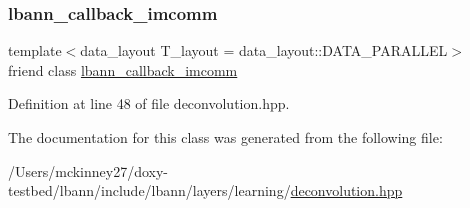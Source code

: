 \subsubsection{\texorpdfstring{lbann\+\_\+callback\+\_\+imcomm}{lbann\_callback\_imcomm}}
{\footnotesize\ttfamily template$<$data\+\_\+layout T\+\_\+layout = data\+\_\+layout\+::\+D\+A\+T\+A\+\_\+\+P\+A\+R\+A\+L\+L\+EL$>$ \\
friend class \hyperlink{classlbann_1_1lbann__callback__imcomm}{lbann\+\_\+callback\+\_\+imcomm}\hspace{0.3cm}{\ttfamily [friend]}}



Definition at line 48 of file deconvolution.\+hpp.



The documentation for this class was generated from the following file\+:\begin{DoxyCompactItemize}
\item 
/\+Users/mckinney27/doxy-\/testbed/lbann/include/lbann/layers/learning/\hyperlink{deconvolution_8hpp}{deconvolution.\+hpp}\end{DoxyCompactItemize}
